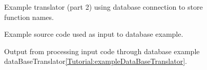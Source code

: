 \begin{figure}[!h]
{\indent
{\mySmallFontSize


\begin{latexonly}
   
\end{latexonly}

\begin{htmlonly}
   
\end{htmlonly}

}
}
\caption{Example translator (part 2) using database connection to store function names.}
\label{Tutorial:exampleDataBaseTranslator2}
\end{figure}

\begin{figure}[!h]
{\indent
{\mySmallFontSize


\begin{latexonly}
   
\end{latexonly}

\begin{htmlonly}
   
\end{htmlonly}

}
}
\caption{Example source code used as input to database example.}
\label{Tutorial:exampleDataBase1}
\end{figure}

\begin{figure}[!h]
{\indent
{\mySmallFontSize


\begin{latexonly}
   
\end{latexonly}

\begin{htmlonly}
   
\end{htmlonly}

}
}
\caption{Output from processing input code through database example dataBaseTranslator\ref{Tutorial:exampleDataBaseTranslator}.}
\label{Tutorial:exampleTemplate1Output}
\end{figure}


